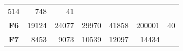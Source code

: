 \documentclass[12pt,a4paper]{article}
\begin{document}
\begin{longtable}[c]{@{}crrrrrr@{}}
\begin{minipage}[t]{0.10\columnwidth}\raggedleft\strut
514
\strut\end{minipage} &
\begin{minipage}[t]{0.11\columnwidth}\raggedleft\strut
748
\strut\end{minipage} &
\begin{minipage}[t]{0.07\columnwidth}\raggedleft\strut
41
\strut\end{minipage}\tabularnewline
\begin{minipage}[t]{0.11\columnwidth}\centering\strut
\textbf{F6}
\strut\end{minipage} &
\begin{minipage}[t]{0.08\columnwidth}\raggedleft\strut
19124
\strut\end{minipage} &
\begin{minipage}[t]{0.08\columnwidth}\raggedleft\strut
24077
\strut\end{minipage} &
\begin{minipage}[t]{0.09\columnwidth}\raggedleft\strut
29970
\strut\end{minipage} &
\begin{minipage}[t]{0.10\columnwidth}\raggedleft\strut
41858
\strut\end{minipage} &
\begin{minipage}[t]{0.11\columnwidth}\raggedleft\strut
200001
\strut\end{minipage} &
\begin{minipage}[t]{0.07\columnwidth}\raggedleft\strut
40
\strut\end{minipage}\tabularnewline
\begin{minipage}[t]{0.11\columnwidth}\centering\strut
\textbf{F7}
\strut\end{minipage} &
\begin{minipage}[t]{0.08\columnwidth}\raggedleft\strut
8453
\strut\end{minipage} &
\begin{minipage}[t]{0.08\columnwidth}\raggedleft\strut
9073
\strut\end{minipage} &
\begin{minipage}[t]{0.09\columnwidth}\raggedleft\strut
10539
\strut\end{minipage} &
\begin{minipage}[t]{0.10\columnwidth}\raggedleft\strut
12097
\strut\end{minipage} &
\begin{minipage}[t]{0.11\columnwidth}\raggedleft\strut
14434
\strut\end{minipage} &

\end{longtable}
\end{document}
